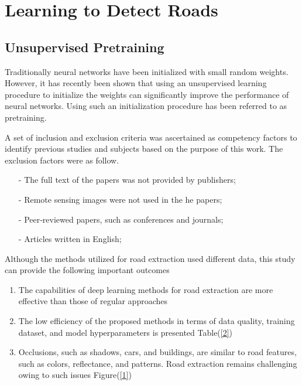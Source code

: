 \documentclass[12pt]{article}
\begin{document}
\section{Learning to Detect Roads}
\subsection{Unsupervised Pretraining}  

\raggedright Traditionally neural networks have been initialized with small random weights. However, it has recently been shown that using an unsupervised learning procedure to initialize the weights can significantly improve the performance of neural networks. Using such an initialization procedure has been referred to as pretraining.
\newline

\raggedright A  set  of  inclusion  and  exclusion  criteria  was  ascertained  as  competency  factors  to  identify  previous  studies  and  subjects  based  on  the  purpose  of  this  work.  The exclusion factors  were as follow.
\noindent

\begin{itemize}
    \item[-] The full text of the papers was not provided by publishers;
    \item[-] Remote sensing images were not used in the he papers;
    \item[-] Peer‐reviewed papers, such as conferences and journals;
    \item[-] Articles written in English;
\end{itemize}

\raggedright Although the methods utilized for road extraction used different data, this study can provide the following important outcomes 

\noindent
\begin{enumerate}
\item The capabilities of deep learning methods for road extraction are more effective than those of regular approaches
\item The low efficiency of the proposed methods in terms of data quality, training dataset, and model hyperparameters is presented Table(\ref{2})
\item Occlusions, such as shadows, cars, and buildings, are similar to road features, such as colors, reflectance, and patterns. Road extraction remains challenging owing to such issues Figure(\ref{1})
\end{enumerate}
\end{document}
